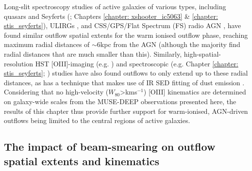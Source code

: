 Long-slit spectroscopy studies of active galaxies of various types, including quasars and Seyferts (\citealt{Das2006, VillarMartin2016}; Chapters \ref{chapter: xshooter_ic5063} \& \ref{chapter: stis_seyferts}), ULIRGs \citep{Spence2016, Rose2018, Spence2018, Tadhunter2019}, and CSS/GPS/Flat Spectrum (FS) radio AGN \citep{Santoro2020}, have found similar outflow spatial extents for the warm ionised outflow phase, reaching maximum radial distances of $\sim$6\;kpc from the AGN (although the majority find radial distances that are much smaller than this). Similarly, high-spatial-resolution HST [OIII]-imaging (e.g. \citealt{Fischer2018, Tadhunter2018}) and spectroscopic (e.g. Chapter \ref{chapter: stis_seyferts}; \citealt{Das2005, Das2006, Tadhunter2019}) studies have also found outflows to only extend up to these radial distances, as has a technique that makes use of IR SED fitting of dust emission \citep{Baron2019a}. Considering that no high-velocity ($W_\mathrm{80}$\;\textgreater{}\;km\;s$^{-1}$) [OIII] kinematics are determined on galaxy-wide scales from the MUSE-DEEP observations presented here, the results of this chapter thus provide further support for warm-ionised, AGN-driven outflows being limited to the central regions of active galaxies.

\newpage
\subsection{The impact of beam-smearing on outflow spatial extents and kinematics}
\label{section: muse_f13451_1232: discussion: impact_on_extents_and_kinematics}


